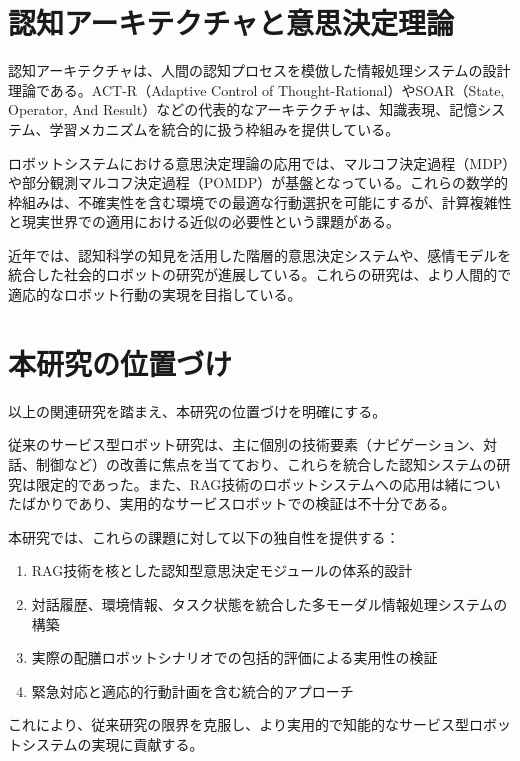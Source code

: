 \documentclass[12pt]{report}
\begin{document}
\section{認知アーキテクチャと意思決定理論}
\label{sec:cognitive_architecture}

認知アーキテクチャは、人間の認知プロセスを模倣した情報処理システムの設計理論である。ACT-R（Adaptive Control of Thought-Rational）やSOAR（State, Operator, And Result）などの代表的なアーキテクチャは、知識表現、記憶システム、学習メカニズムを統合的に扱う枠組みを提供している。

ロボットシステムにおける意思決定理論の応用では、マルコフ決定過程（MDP）や部分観測マルコフ決定過程（POMDP）が基盤となっている。これらの数学的枠組みは、不確実性を含む環境での最適な行動選択を可能にするが、計算複雑性と現実世界での適用における近似の必要性という課題がある。

近年では、認知科学の知見を活用した階層的意思決定システムや、感情モデルを統合した社会的ロボットの研究が進展している。これらの研究は、より人間的で適応的なロボット行動の実現を目指している。

\section{本研究の位置づけ}
\label{sec:positioning}

以上の関連研究を踏まえ、本研究の位置づけを明確にする。

従来のサービス型ロボット研究は、主に個別の技術要素（ナビゲーション、対話、制御など）の改善に焦点を当てており、これらを統合した認知システムの研究は限定的であった。また、RAG技術のロボットシステムへの応用は緒についたばかりであり、実用的なサービスロボットでの検証は不十分である。

本研究では、これらの課題に対して以下の独自性を提供する：

\begin{enumerate}
  \item RAG技術を核とした認知型意思決定モジュールの体系的設計
  \item 対話履歴、環境情報、タスク状態を統合した多モーダル情報処理システムの構築
  \item 実際の配膳ロボットシナリオでの包括的評価による実用性の検証
  \item 緊急対応と適応的行動計画を含む統合的アプローチ
\end{enumerate}

これにより、従来研究の限界を克服し、より実用的で知能的なサービス型ロボットシステムの実現に貢献する。
\end{document}
